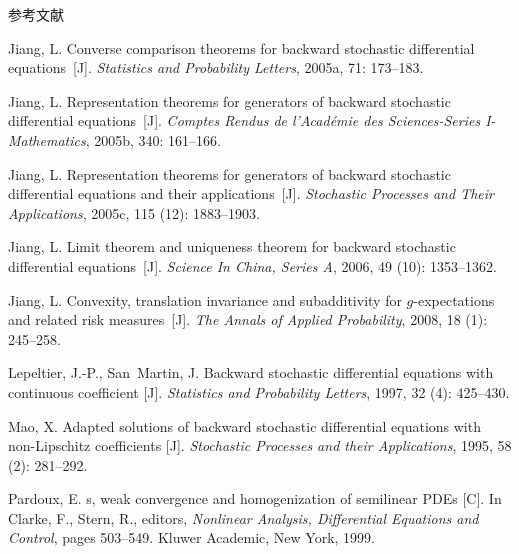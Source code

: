 \documentclass[xcolor=svgnames,serif,table,10pt]{beamer}
\begin{document}
\begin{frame}[allowframebreaks]{参考文献}
\begin{thebibliography}{57}
Jiang, L.
\newblock Converse comparison theorems for backward stochastic differential
  equations~[J].
\newblock \emph{Statistics and Probability Letters}, 2005a, 71:
  173--183.

Jiang, L.
\newblock Representation theorems for generators of backward stochastic
  differential equations~[J].
\newblock \emph{Comptes Rendus de l'Acad{\'e}mie des Sciences-Series
  I-Mathematics}, 2005b, 340: 161--166.

Jiang, L.
\newblock Representation theorems for generators of backward stochastic
  differential equations and their applications~[J].
\newblock \emph{Stochastic Processes and Their Applications}, 2005c,
  115 (12): 1883--1903.

Jiang, L.
\newblock Limit theorem and uniqueness theorem for backward stochastic
  differential equations~[J].
\newblock \emph{Science In China, Series A}, 2006, 49 (10):
  1353--1362.

Jiang, L.
\newblock Convexity, translation invariance and subadditivity for
  $g$-expectations and related risk measures~[J].
\newblock \emph{The Annals of Applied Probability}, 2008, 18
  (1): 245--258.


Lepeltier, J.-P., San~Martin, J.
\newblock Backward stochastic differential equations with continuous
  coefficient [J].
\newblock \emph{Statistics and Probability Letters}, 1997, 32
  (4): 425--430.

Mao, X.
\newblock Adapted solutions of backward stochastic differential equations with
  non-{L}ipschitz coefficients [J].
\newblock \emph{Stochastic Processes and their Applications}, 1995, 58
  (2): 281--292.

Pardoux, E.
s, weak convergence and homogenization of semilinear
  {PDE}s [C].
\newblock In Clarke, F., Stern, R., editors, \emph{Nonlinear Analysis,
  Differential Equations and Control}, pages 503--549. Kluwer Academic, New
  York, 1999.


\end{thebibliography}
\end{frame}
\end{document}

